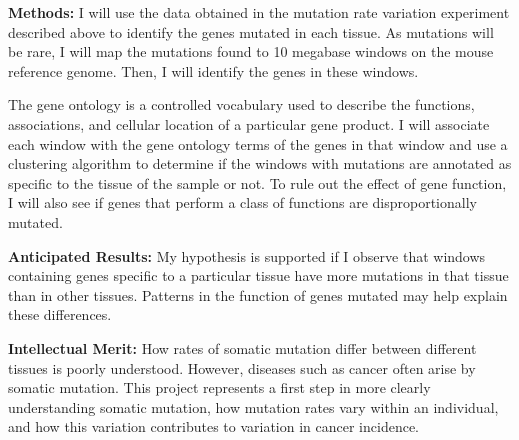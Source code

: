 \documentclass[12pt]{article}
\begin{document}
\textbf{Methods:}
I will use the data obtained in the mutation rate variation experiment described above to identify the genes mutated in each tissue. As mutations will be rare, I will map the mutations found to 10 megabase windows on the mouse reference genome. Then, I will identify the genes in these windows.

The gene ontology is a controlled vocabulary used to describe the functions, associations, and cellular location of a particular gene product. I will associate each window with the gene ontology terms of the genes in that window and use a clustering algorithm to determine if the windows with mutations are annotated as specific to the tissue of the sample or not.%
To rule out the effect of gene function, I will also see if genes that perform a class of functions are disproportionally mutated.


\textbf{Anticipated Results:}
My hypothesis is supported if I observe that windows containing genes specific to a particular tissue have more mutations in that tissue than in other tissues. Patterns in the function of genes mutated may help explain these differences.

\textbf{Intellectual Merit:}
How rates of somatic mutation differ between different tissues is poorly understood. However, diseases such as cancer often arise by somatic mutation.
This project represents a first step in more clearly understanding somatic mutation, how mutation rates vary within an individual, and how this variation contributes to variation in cancer incidence.
\end{document}
